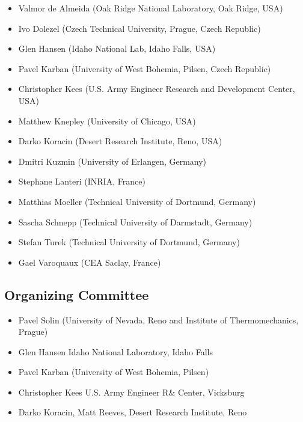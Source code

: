 \documentclass[article,A4,11pt]{llncs}
\begin{document}
\begin{itemize}
\item Valmor de Almeida (Oak Ridge National Laboratory, Oak Ridge, USA)
\item Ivo Dolezel (Czech Technical University, Prague, Czech Republic)
\item Glen Hansen (Idaho National Lab, Idaho Falls, USA)
\item Pavel Karban (University of West Bohemia, Pilsen, Czech Republic)
\item Christopher Kees (U.S. Army Engineer Research and Development Center, USA)
\item Matthew Knepley (University of Chicago, USA)
\item Darko Koracin (Desert Research Institute, Reno, USA)
\item Dmitri Kuzmin (University of Erlangen, Germany)
\item Stephane Lanteri (INRIA, France)
\item Matthias Moeller (Technical University of Dortmund, Germany)
\item Sascha Schnepp (Technical University of Darmstadt, Germany)
\item Stefan Turek (Technical University of Dortmund, Germany)
\item Gael Varoquaux (CEA Saclay, France)
\end{itemize}

\subsection*{Organizing Committee}

\begin{itemize}
\item Pavel Solin (University of Nevada, Reno and Institute of Thermomechanics, Prague)
\item Glen Hansen Idaho National Laboratory, Idaho Falls
\item Pavel Karban  (University of West Bohemia, Pilsen)
\item Christopher Kees U.S. Army Engineer R\& Center, Vicksburg
\item Darko Koracin, Matt Reeves, Desert Research Institute, Reno
\end{itemize}

\newpage
{\ }
\tableofcontents
\pagestyle{plain}

\end{document}
